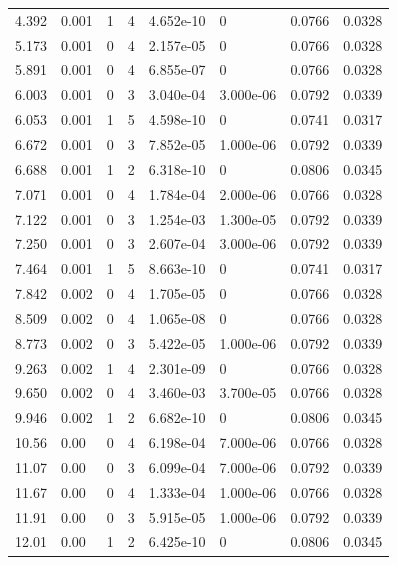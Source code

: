 \documentclass[preview]{standalone}
\begin{document}
{{\begin{tabular}{L{1.2cm}C{1.2cm} C{0.3cm}C{0.5cm} C{1.4cm}C{1.4cm} C{1.4cm}C{1.4cm}}
  4.392  &  0.001  & 1     &  4 &  4.652e-10  & 0  & 0.0766 &  0.0328   \\ 
  5.173  &  0.001  & 0     &  4 &  2.157e-05  & 0  & 0.0766 &  0.0328   \\ 
  5.891  &  0.001  & 0     &  4 &  6.855e-07  & 0  & 0.0766 &  0.0328   \\ 
  6.003  &  0.001  & 0     &  3 &  3.040e-04  & 3.000e-06  & 0.0792 &  0.0339   \\ 
  6.053  &  0.001  & 1     &  5 &  4.598e-10  & 0  & 0.0741 &  0.0317   \\ 
  6.672  &  0.001  & 0     &  3 &  7.852e-05  & 1.000e-06  & 0.0792 &  0.0339   \\ 
  6.688  &  0.001  & 1     &  2 &  6.318e-10  & 0  & 0.0806 &  0.0345   \\ 
  7.071  &  0.001  & 0     &  4 &  1.784e-04  & 2.000e-06  & 0.0766 &  0.0328   \\ 
  7.122  &  0.001  & 0     &  3 &  1.254e-03  & 1.300e-05  & 0.0792 &  0.0339   \\ 
  7.250  &  0.001  & 0     &  3 &  2.607e-04  & 3.000e-06  & 0.0792 &  0.0339   \\ 
  7.464  &  0.001  & 1     &  5 &  8.663e-10  & 0  & 0.0741 &  0.0317   \\ 
  7.842  &  0.002  & 0     &  4 &  1.705e-05  & 0  & 0.0766 &  0.0328   \\ 
  8.509  &  0.002  & 0     &  4 &  1.065e-08  & 0  & 0.0766 &  0.0328   \\ 
  8.773  &  0.002  & 0     &  3 &  5.422e-05  & 1.000e-06  & 0.0792 &  0.0339   \\ 
  9.263  &  0.002  & 1     &  4 &  2.301e-09  & 0  & 0.0766 &  0.0328   \\ 
  9.650  &  0.002  & 0     &  4 &  3.460e-03  & 3.700e-05  & 0.0766 &  0.0328   \\ 
  9.946  &  0.002  & 1     &  2 &  6.682e-10  & 0  & 0.0806 &  0.0345   \\ 
  10.56  &  0.00  & 0     &  4 &  6.198e-04  & 7.000e-06  & 0.0766 &  0.0328   \\ 
  11.07  &  0.00  & 0     &  3 &  6.099e-04  & 7.000e-06  & 0.0792 &  0.0339   \\ 
  11.67  &  0.00  & 0     &  4 &  1.333e-04  & 1.000e-06  & 0.0766 &  0.0328   \\ 
  11.91  &  0.00  & 0     &  3 &  5.915e-05  & 1.000e-06  & 0.0792 &  0.0339   \\ 
  12.01  &  0.00  & 1     &  2 &  6.425e-10  & 0  & 0.0806 &  0.0345   \\ 

\end{tabular}}}
\end{document}
